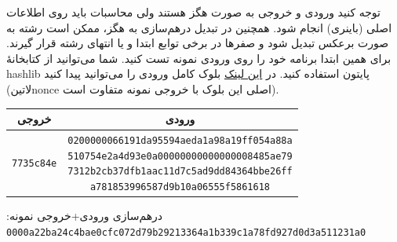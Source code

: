 توجه کنید ورودی و خروجی به صورت هگز هستند ولی محاسبات باید روی اطلاعات اصلی (باینری) انجام شود. همچنین در تبدیل درهم‌سازی به هگز، ممکن است رشته به صورت برعکس تبدیل شود و صفرها در برخی توابع ابتدا و یا انتهای رشته قرار گیرند. برای همین ابتدا برنامه خود را روی ورودی نمونه تست کنید. شما می‌توانید از کتابخانهٔ hashlib پایتون استفاده کنید.
در
\href{https://webbtc.com/block/000000000000000001f942eb4bfa0aeccb6a14c268f4c72d5fff17270da771b9}{این لینک}
بلوک کامل ورودی را می‌توانید پیدا کنید (‌لاتین{nonce} اصلی این بلوک با خروجی نمونه متفاوت است).

\begin{center}\small
	\begin{tabular}{|c|c|}
		\hline
		خروجی                 
		& ورودی    \\ \hline
		\texttt{7735c84e} &
		\parbox[t]{8.1cm}{\normalsize\raggedright{\texttt{0200000066191da95594aeda1a98a19ff054a88a\\
					510754e2a4d93e0a00000000000000008485ae79\\
					7312b2cb37dfb1aac11d7c5ad9dd84364bbe26ff\\
					a781853996587d9b10a06555f5861618}}\vspace{0.2cm}}
		\\ \hline
	\end{tabular}
\end{center}
درهم‌سازی ورودی+خروجی نمونه:
{\small\texttt{0000a22ba24c4bae0cfc072d79b29213364a1b339c1a78fd927d0d3a511231a0}}









